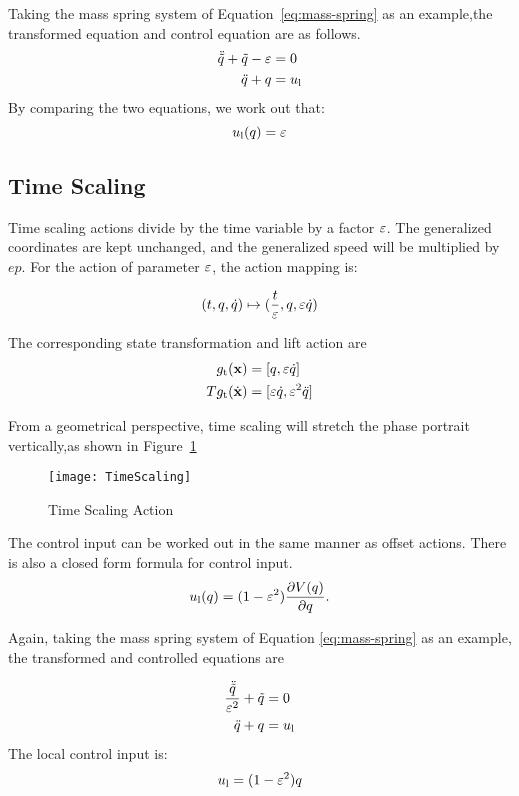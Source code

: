 Taking the mass spring system of Equation~\ref{eq:mass-spring} as an example,the transformed equation  and control equation are as follows.
\begin{align}
\ddot{\tilde{q}}+\tilde{q}-\varepsilon&=0 \nonumber \\
\ddot{q}+q&=u_{\mathrm{l}} \nonumber
\end{align}
By comparing the two equations, we work out that:
\[
u_{\mathrm{l}}(q)=\varepsilon
\]




\subsection*{Time Scaling}

Time scaling actions divide by the time variable by a factor $\varepsilon$.
The generalized coordinates are kept unchanged, and the generalized speed will be multiplied by $ep$.
For the action of parameter $\varepsilon$, the action mapping is: 


\[
(t,q,\dot{q}) \mapsto (\frac{t}{\varepsilon},q,\varepsilon \dot{q})
\]

The corresponding state transformation and lift action are
\begin{align}
g_{\mathrm{t}}(\mathbf{x})&=[q,\varepsilon \dot{q}] \nonumber \\
Tg_{\mathrm{t}}(\dot{\mathbf{x}})&=[\varepsilon \dot{q},\varepsilon^2 \ddot{q}]\nonumber
\end{align}

From a geometrical perspective, time scaling will stretch the phase portrait vertically,as shown in Figure~\ref{fig:gts}
\begin{figure}[!htbp]
  \begin{center}
    \texttt{[image: TimeScaling]}
	 \caption{Time Scaling Action}
    \label{fig:gts}
\end{center}
\end{figure}

The control input can be worked out in the same manner as offset actions.
There is also a closed form formula for control input.
\begin{equation}
u_{\mathrm{l}}(q) = (1-\varepsilon^2) \frac{\partial V(q)}{\partial q}.
\end{equation}

Again, taking the mass spring system of Equation \ref{eq:mass-spring} as an example, the transformed and controlled equations are

\begin{align}
\frac{\ddot{\tilde{q}}}{\varepsilon^2}+\tilde{q}&=0 \nonumber \\
\ddot{q}+q&=u_{\mathrm{l}} \nonumber
\end{align}
The local control input is:
\[
u_{\mathrm{l}}=(1-\varepsilon^2)q
\]




